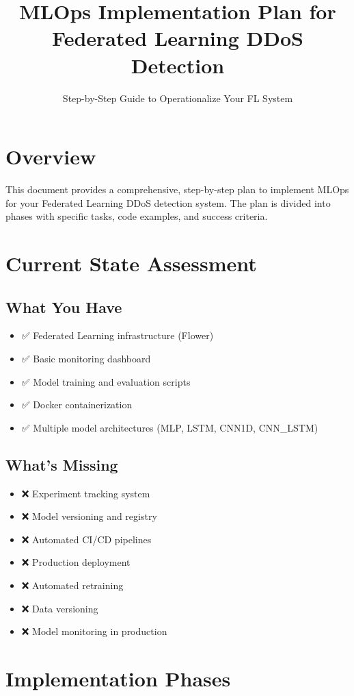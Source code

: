 \documentclass[12pt]{article}
\title{MLOps Implementation Plan for Federated Learning DDoS Detection}
\subtitle{Step-by-Step Guide to Operationalize Your FL System}
\author{}
\date{}
\begin{document}
\maketitle

\section{Overview}

This document provides a comprehensive, step-by-step plan to implement MLOps for your Federated Learning DDoS detection system. The plan is divided into phases with specific tasks, code examples, and success criteria.

\section{Current State Assessment}

\subsection{What You Have}
\begin{itemize}
    \item ✅ Federated Learning infrastructure (Flower)
    \item ✅ Basic monitoring dashboard
    \item ✅ Model training and evaluation scripts
    \item ✅ Docker containerization
    \item ✅ Multiple model architectures (MLP, LSTM, CNN1D, CNN\_LSTM)
\end{itemize}

\subsection{What's Missing}
\begin{itemize}
    \item ❌ Experiment tracking system
    \item ❌ Model versioning and registry
    \item ❌ Automated CI/CD pipelines
    \item ❌ Production deployment
    \item ❌ Automated retraining
    \item ❌ Data versioning
    \item ❌ Model monitoring in production
\end{itemize}

\section{Implementation Phases}
\end{document}
